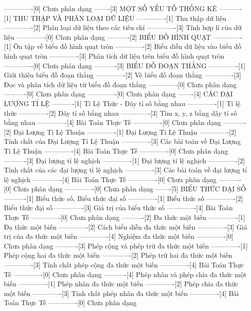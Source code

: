 -------------[0] Chưa phân dạng
-------[3] MỘT SỐ YẾU TỐ THỐNG KÊ
----------[1] THU THẬP VÀ PHÂN LOẠI DỮ LIỆU
-------------[1] Thu thập dữ liệu
-------------[2] Phân loại dữ liệu theo các tiêu chí
-------------[3] Tính hợp lí của dữ liệu
-------------[0] Chưa phân dạng
----------[2] BIỂU ĐỒ HÌNH QUẠT
-------------[1] Ôn tập về biểu đồ hình quạt tròn
-------------[2] Biểu diễn dữ liệu vào biểu đồ hình quạt tròn
-------------[3] Phân tích dữ liệu trên biểu đồ hình quạt tròn
-------------[0] Chưa phân dạng
----------[3] BIỂU ĐỒ ĐOẠN THẲNG
-------------[1] Giới thiệu biểu đồ đoạn thẳng
-------------[2] Vẽ biểu đồ đoạn thẳng
-------------[3] Đọc và phân tích dữ liệu từ biểu đồ đoạn thẳng
-------------[0] Chưa phân dạng
----------[0] Chưa phân dạng
-------------[0] Chưa phân dạng
-------[4] CÁC ĐẠI LƯỢNG TỈ LỆ
----------[1] Tỉ Lệ Thức - Dãy tỉ số bằng nhau
-------------[1] Tỉ lệ thức
-------------[2] Dãy tỉ số bằng nhau
-------------[3] Tìm x, y, z bằng dãy tỉ số bằng nhau
-------------[4] Bài Toán Thực Tế
-------------[0] Chưa phân dạng
----------[2] Đại Lượng Tỉ Lệ Thuận
-------------[1] Đại Lượng Tỉ Lệ Thuận
-------------[2] Tính chất của Đại Lượng Tỉ Lệ Thuận
-------------[3] Các bài toán về Đại Lượng Tỉ Lệ Thuận
-------------[4] Bài Toán Thực Tế
-------------[0] Chưa phân dạng
----------[3] Đại lượng tỉ lệ nghịch
-------------[1] Đại lượng tỉ lệ nghịch
-------------[2] Tính chất của các đại lượng tỉ lệ nghịch
-------------[3] Các bài toán về đại lượng tỉ lệ nghịch
-------------[4] Bài Toán Thực Tế
-------------[0] Chưa phân dạng
----------[0] Chưa phân dạng
-------------[0] Chưa phân dạng
-------[5] BIỂU THỨC ĐẠI SỐ
----------[1] Biểu thức số, Biểu thức đại số
-------------[1] Biểu thức số
-------------[2] Biểu thức đại số
-------------[3] Giá trị của biểu thức số
-------------[4] Bài Toán Thực Tế
-------------[0] Chưa phân dạng
----------[2] Đa thức một biến
-------------[1] Đa thức một biến
-------------[2] Cách biểu diễn đa thức một biến
-------------[3] Giá trị của đa thức một biến
-------------[4] Nghiệm đa thức một biến
-------------[0] Chưa phân dạng
----------[3] Phép cộng và phép trừ đa thức một biến
-------------[1] Phép cộng hai đa thức một biến
-------------[2] Phép trừ hai đa thức một biến
-------------[3] Tính chất phép cộng đa thức một biến
-------------[4] Bài Toán Thực Tế
-------------[0] Chưa phân dạng
----------[4] Phép nhân và phép chia đa thức một biến
-------------[1] Phép nhân đa thức một biến
-------------[2] Phép chia đa thức một biến
-------------[3] Tính chất phép nhân đa thức một biến
-------------[4] Bài Toán Thực Tế
-------------[0] Chưa phân dạng
